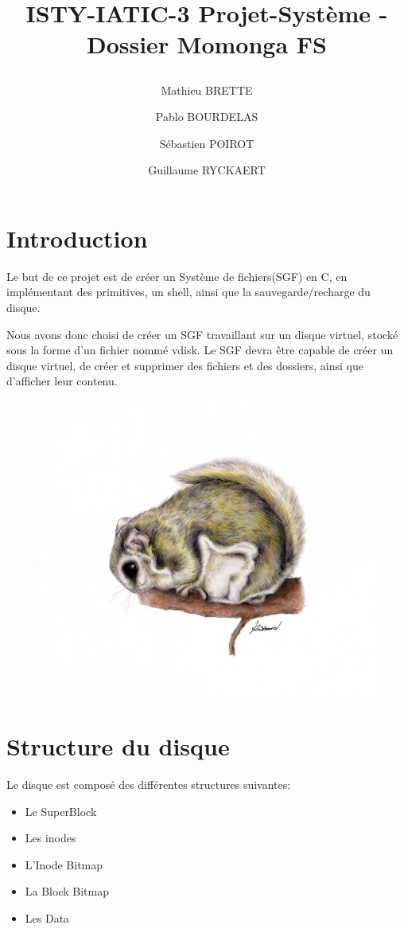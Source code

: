 \documentclass{report}
\begin{document}
\onehalfspacing
\title{%
    \begin{minipage}\linewidth
        \centering
        ISTY-IATIC-3
        \vskip 3pt
        \large Projet-Système - Dossier Momonga FS
    \author{Mathieu BRETTE \and Pablo BOURDELAS \and Sébastien POIROT\and Guillaume RYCKAERT}
    \end{minipage}
 }
 \maketitle

 \section*{Introduction}

 Le but de ce projet est de créer un Système de fichiers(SGF) en C, en implémentant des primitives, un shell, ainsi que la sauvegarde/recharge du disque.

Nous avons donc choisi de créer un SGF travaillant sur un disque virtuel, stocké sous la forme d'un fichier nommé vdisk. Le SGF devra être capable de créer un disque virtuel, de créer et supprimer des fichiers et des dossiers, ainsi que d'afficher leur contenu.
\vskip 10pt
\begin{figure}[ht!]
        \centering
        \includegraphics[width=125mm]{momonga.png}
\end{figure}

\newpage

\section*{Structure du disque}
Le disque est composé des différentes structures suivantes:
\begin{itemize}
\item Le SuperBlock
\item Les inodes
\item L'Inode Bitmap
\item La Block Bitmap
\item Les Data
\end{itemize}
\end{document}
